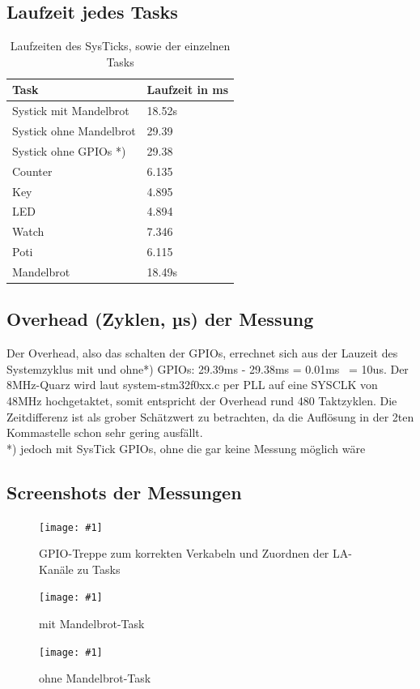 \documentclass{article}
\newcommand{\bild}[3]{\begin{figure}[h!]		\begin{center}			\texttt{[image: \#1]}			\caption{#2}		\end{center}	\end{figure}}
\begin{document}
\subsection{Laufzeit jedes Tasks}
	\begin{table}[h!]
		\begin{center}		
			\begin{tabular}{ l | l }	 %
				Task & Laufzeit in ms \\ \hline
				Systick mit Mandelbrot	& 18.52s \\ \hline
				Systick ohne Mandelbrot	& 29.39 	\\ \hline
				Systick ohne GPIOs *)	& 29.38 \\ \hline
				Counter	& 6.135 \\ \hline
				Key& 4.895 \\ \hline
				LED	& 4.894 \\ \hline
				Watch	& 7.346 \\ \hline
				Poti	& 6.115 \\ \hline
				Mandelbrot	& 18.49s \\ %
			\end{tabular}
			\caption{Laufzeiten des SysTicks, sowie der einzelnen Tasks}
		\end{center}		
	\end{table}
\subsection{Overhead (Zyklen, µs) der Messung}
Der Overhead, also das schalten der GPIOs, errechnet sich aus der Lauzeit des Systemzyklus mit und ohne*) GPIOs: 29.39ms - 29.38ms = 0.01ms ~= 10us. Der 8MHz-Quarz wird laut system-stm32f0xx.c per PLL auf eine SYSCLK von 48MHz hochgetaktet, somit entspricht der Overhead rund 480 Taktzyklen. Die Zeitdifferenz ist als grober Schätzwert zu betrachten, da die Auflösung in der 2ten Kommastelle schon sehr gering ausfällt. \\
	*) jedoch mit SysTick GPIOs, ohne die gar keine Messung möglich wäre

\subsection{Screenshots der Messungen }
\bild{tryGPIO}{GPIO-Treppe zum korrekten Verkabeln und Zuordnen der LA-Kanäle zu Tasks}{width=\textwidth}
\bild{02_mitMandelbrot}{mit Mandelbrot-Task}{width=\textwidth}
\bild{03_ohneMandelbrot_time}{ohne Mandelbrot-Task}{width=\textwidth}
\end{document}
